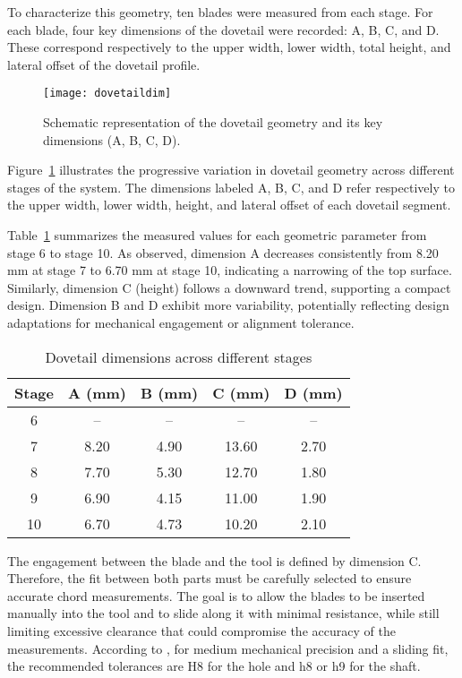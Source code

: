 To characterize this geometry, ten blades were measured from each stage. For each blade, four key dimensions of the dovetail were recorded: A, B, C, and D. 
These correspond respectively to the upper width, lower width, total height, and lateral offset of the dovetail profile.


\begin{figure}[H]
\centering
\texttt{[image: dovetaildim]}
\caption{Schematic representation of the dovetail geometry and its key dimensions (A, B, C, D).}
\label{fig:dovetails}
\end{figure}

Figure~\ref{fig:dovetails} illustrates the progressive variation in dovetail geometry across different stages of the system. 
The dimensions labeled A, B, C, and D refer respectively to the upper width, lower width, height, and lateral offset of each dovetail segment. 


Table~\ref{tab:dovetail_dimensions} summarizes the measured values for each geometric parameter from stage 6 to stage 10. 
As observed, dimension A decreases consistently from 8.20 mm at stage 7 to 6.70 mm at stage 10, indicating a narrowing of the top surface. Similarly, dimension C (height) follows a downward trend, supporting a compact design. 
Dimension B and D exhibit more variability, potentially reflecting design adaptations for mechanical engagement or alignment tolerance.

\begin{table}[H]
    \centering
    \caption{Dovetail dimensions across different stages}
    \label{tab:dovetail_dimensions}
    \begin{tabular}{ccccc}
        \hline
        \textbf{Stage} & \textbf{A (mm)} & \textbf{B (mm)} & \textbf{C (mm)} & \textbf{D (mm)} \\
        \hline
        6  & --   & --   & --    & --    \\
        7  & 8.20 & 4.90 & 13.60 & 2.70  \\
        8  & 7.70 & 5.30 & 12.70 & 1.80  \\
        9  & 6.90 & 4.15 & 11.00 & 1.90  \\
        10 & 6.70 & 4.73 & 10.20 & 2.10  \\
        \hline
    \end{tabular}
\end{table}

The engagement between the blade and the tool is defined by dimension C. Therefore, the fit between both parts must be carefully selected to ensure accurate chord measurements. 
The goal is to allow the blades to be inserted manually into the tool and to slide along it with minimal resistance, while still limiting excessive clearance that could compromise the accuracy of the measurements. 
According to \cite{TabelaAjustesMecanicos}, for medium mechanical precision and a sliding fit, the recommended tolerances are H8 for the hole and h8 or h9 for the shaft.

